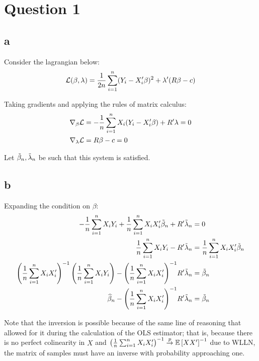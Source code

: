 \documentclass[12pt]{paper}
\begin{document}
\section*{Question 1}

\subsection*{a}

Consider the lagrangian below:
\begin{equation*}
  \mathcal{L}(\beta,\lambda) = \frac{1}{2n} \sum_{i=1}^n ( Y_i - X_i' \beta)^2 + \lambda' ( R
  \beta - c)
\end{equation*}

Taking gradients and applying the rules of matrix calculus:
\begin{align*}
  \nabla_{\beta} \mathcal{L} &= -\frac{1}{n}\sum_{i=1}^n X_i ( Y_i - X_i' \beta) + R' \lambda
  = 0\\
  \nabla_{\lambda} \mathcal{L} &= R \beta - c = 0
\end{align*}

Let $\tilde{ \beta }_{n}, \tilde{ \lambda }_{n}$ be such that this system is satisfied. 

\subsection*{b}

Expanding the condition on $\beta$:
\begin{align*}
 - \frac{1}{n}\sum_{i=1}^n X_i Y_i +\frac{1}{n} \sum_{i=1}^n X_i X_i'
  \tilde{ \beta }_{n} + R' \tilde{ \lambda }_{n} &= 0\\
  \frac{1}{n} \sum_{i=1}^n X_i Y_i - R' \tilde{ \lambda }_{n} &= \frac{1}{n}
                                                  \sum_{i=1}^n X_i X_i'
                                                  \tilde{ \beta }_{n}\\
  {\left( \frac{1}{n} \sum_{i=1}^n X_i X_i'  \right)}^{-1} \left(
  \frac{1}{n} \sum_{i=1}^n  X_i Y_i \right) - {\left( \frac{1}{n}
  \sum_{i=1}^n X_i X_i'  \right)}^{-1} R' \tilde{ \lambda }_{n} &= \tilde{ \beta }_{n}\\
  \widehat{ \beta }_{n} - {\left( \frac{1}{n} \sum_{i=1}^n X_i X_i'
  \right)}^{-1} R' \tilde{ \lambda }_{n} &= \tilde{ \beta }_{n}
\end{align*}

Note that the inversion is possible because of the same line of
reasoning that allowed for it during the calculation of the OLS
estimator; that is, because there is no perfect colinearity in $X$ and ${\left( \frac{1}{n} \sum_{i=1}^n X_i X_i'  \right)}^{-1}\overset{p}{\to}\mathbb{E} \left [ XX' \right ]^{-1}$ due to WLLN, the matrix of samples must have an inverse with probability approaching one.
\end{document}
